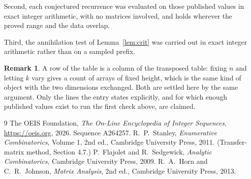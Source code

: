 \documentclass[11pt,a4paper]{article}
\theoremstyle{plain}
\theoremstyle{definition}
\newtheorem{remark}[theorem]{Remark}
\begin{document}
Second, each conjectured recurrence was evaluated on those published values in exact
integer arithmetic, with no matrices involved, and holds wherever the proved range and the
data overlap.

Third, the annihilation test of Lemma~\ref{lem:crit} was carried out in exact integer
arithmetic rather than on a sampled prefix.

\begin{remark}
A row of the table is a column of the transposed table: fixing $n$ and letting $k$ vary gives a
count of arrays of fixed height, which is the same kind of object with the two dimensions
exchanged. Both are settled here by the same argument. Only the lines the entry states
explicitly, and for which enough published values exist to run the first check above, are
claimed.
\end{remark}

\begin{thebibliography}{9}
 The OEIS Foundation, \emph{The On-Line Encyclopedia of Integer
Sequences}, \url{https://oeis.org}, 2026. Sequence A264257.
 R.~P.~Stanley, \emph{Enumerative Combinatorics}, Volume 1, 2nd ed.,
Cambridge University Press, 2011. (Transfer-matrix method, Section 4.7.)
 P.~Flajolet and R.~Sedgewick, \emph{Analytic Combinatorics}, Cambridge
University Press, 2009.
 R.~A.~Horn and C.~R.~Johnson, \emph{Matrix Analysis}, 2nd ed., Cambridge
University Press, 2013.
\end{thebibliography}
\end{document}
